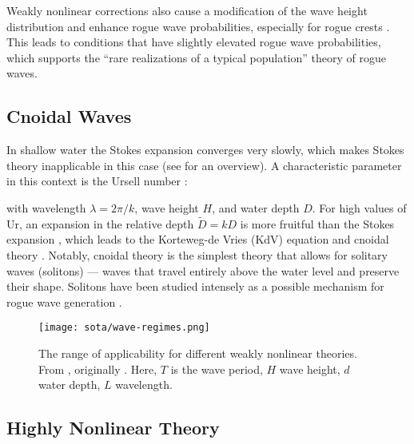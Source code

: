 Weakly nonlinear corrections also cause a modification of the wave height distribution and enhance rogue wave probabilities, especially for rogue crests \citep{gemmrich_dynamical_2011,fedele_real_2016,fedele_large_2019}. This leads to conditions that have slightly elevated rogue wave probabilities, which supports the \enquote{rare realizations of a typical population} theory of rogue waves.

\subsection{Cnoidal Waves}

In shallow water the Stokes expansion converges very slowly, which makes Stokes theory inapplicable in this case (see  for an overview). A characteristic parameter in this context is the Ursell number \citep{ursell_long-wave_1953}:


with wavelength $\lambda = 2\pi/k$, wave height $H$, and water depth $D$. For high values of $\mathrm{Ur}$, an expansion in the relative depth $\widetilde{D}=kD$ is more fruitful than the Stokes expansion \citep{dean_water_1991}, which leads to the Korteweg-de Vries (KdV) equation and cnoidal theory \citep{korteweg1895xli}. Notably, cnoidal theory is the simplest theory that allows for solitary waves (solitons) --- waves that travel entirely above the water level and preserve their shape. Solitons have been studied intensely as a possible mechanism for rogue wave generation \citep{clamond_interaction_2002,kharif_physical_2003,chabchoub_rogue_2011}.

\begin{figure}
    \centering
    \texttt{[image: sota/wave-regimes.png]}
    \caption{The range of applicability for different weakly nonlinear theories. From \citet{holthuijsen_waves_2010}, originally \citet{mehaute_introduction_2013}. Here, $T$ is the wave period, $H$ wave height, $d$ water depth, $L$ wavelength.} \label{fig:wave-regimes}
\end{figure}

\subsection{Highly Nonlinear Theory}

